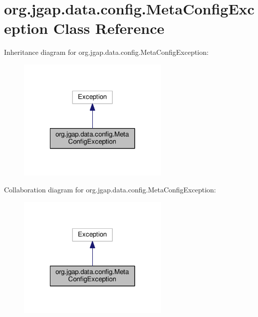 \hypertarget{classorg_1_1jgap_1_1data_1_1config_1_1_meta_config_exception}{\section{org.\-jgap.\-data.\-config.\-Meta\-Config\-Exception Class Reference}
\label{classorg_1_1jgap_1_1data_1_1config_1_1_meta_config_exception}
}


Inheritance diagram for org.\-jgap.\-data.\-config.\-Meta\-Config\-Exception\-:
\nopagebreak
\begin{figure}[H]
\begin{center}
\leavevmode
\includegraphics[width=206pt]{classorg_1_1jgap_1_1data_1_1config_1_1_meta_config_exception__inherit__graph}
\end{center}
\end{figure}


Collaboration diagram for org.\-jgap.\-data.\-config.\-Meta\-Config\-Exception\-:
\nopagebreak
\begin{figure}[H]
\begin{center}
\leavevmode
\includegraphics[width=206pt]{classorg_1_1jgap_1_1data_1_1config_1_1_meta_config_exception__coll__graph}
\end{center}
\end{figure}
